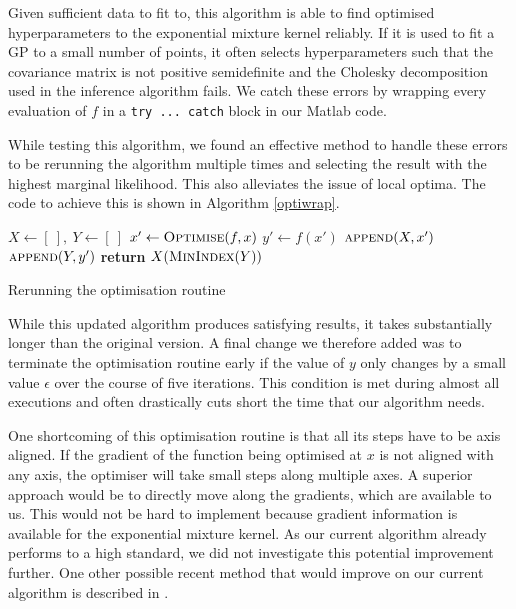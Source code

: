 \documentclass[a4paper,12pt,twoside,openright]{report}
\begin{document}
Given sufficient data to fit to, this algorithm is able to find optimised hyperparameters to the exponential mixture kernel reliably. If it is used to fit a GP to a small number of points, it often selects hyperparameters such that the covariance matrix is not positive semidefinite and the Cholesky decomposition used in the inference algorithm fails. We catch these errors by wrapping every evaluation of $f$ in a \texttt{try ... catch} block in our Matlab code. 

While testing this algorithm, we found an effective method to handle these errors to be rerunning the algorithm multiple times and selecting the result with the highest marginal likelihood. This also alleviates the issue of local optima. The code to achieve this is shown in Algorithm \ref{optiwrap}.

\begin{algorithm}[h]
\begin{algorithmic}[1]
\State $X \gets [\ ],\ Y \gets [\ ]$
\State $x'\gets \Call{Optimise}{f, x}$
\State $y'\gets f(x')$
\State $\Call{append}{X, x'}$
\State $\Call{append}{Y, y'}$
\EndFor
\State \textbf{return} $X(\Call{MinIndex}{Y})$
\EndProcedure
\end{algorithmic}
\caption{Rerunning the optimisation routine}
\label{optiwrap}
\end{algorithm}

While this updated algorithm produces satisfying results, it takes substantially longer than the original version. A final change we therefore added was to terminate the optimisation routine early if the value of $y$ only changes by a small value $\epsilon$ over the course of five iterations. This condition is met during almost all executions and often drastically cuts short the time that our algorithm needs.

One shortcoming of this optimisation routine is that all its steps have to be axis aligned. If the gradient of the function being optimised at $x$ is not aligned with any axis, the optimiser will take small steps along multiple axes. A superior approach would be to directly move along the gradients, which are available to us. This would not be hard to implement because gradient information is available for the exponential mixture kernel. As our current algorithm already performs to a high standard, we did not investigate this potential improvement further. One other possible recent method that would improve on our current algorithm is described in \cite{DBLP:journals/corr/MahsereciH15}.
\end{document}
